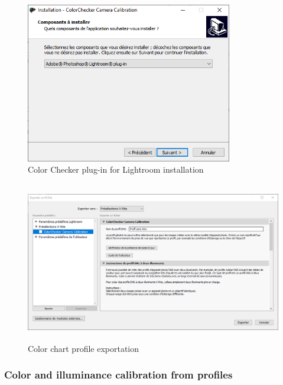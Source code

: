 \documentclass[10pt,letter,english]{article}
\begin{document}
\begin{figure}[H]
\centering
  \centering
  \includegraphics[height=7cm]{Figures/color_checker_plug_in_win.png}
  \caption{Color Checker plug-in for Lightroom installation}
  \label{color_checker_plug_in_win}
\end{figure}%

\begin{figure}[H]
  \centering
  \includegraphics[height=7cm]{Figures/x_rite_preselection.png}
  \caption{Color chart profile exportation}
  \label{x_rite_preselection}
\end{figure}

\subsubsection{Color and illuminance calibration from profiles}
\end{document}
